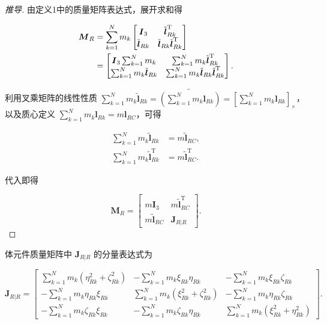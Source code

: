 \begin{proof}[推导]
由定义1中的质量矩阵表达式，展开求和得

\begin{align*}\boldsymbol{M}_R &= \sum_{k=1}^{N} m_k \begin{bmatrix} \boldsymbol{I}_3 & \tilde{\boldsymbol{l}}_{Rk}^{\mathrm{T}} \\ \tilde{\boldsymbol{l}}_{Rk} & \tilde{\boldsymbol{l}}_{Rk} \tilde{\boldsymbol{l}}_{Rk}^{\mathrm{T}} \end{bmatrix} \notag \\
&= \begin{bmatrix} \boldsymbol{I}_3 \sum_{k=1}^{N} m_k & \sum_{k=1}^{N} m_k \tilde{\boldsymbol{l}}_{Rk}^{\mathrm{T}} \\ \sum_{k=1}^{N} m_k \tilde{\boldsymbol{l}}_{Rk} & \sum_{k=1}^{N} m_k \tilde{\boldsymbol{l}}_{Rk} \tilde{\boldsymbol{l}}_{Rk}^{\mathrm{T}} \end{bmatrix}.\end{align*}

利用叉乘矩阵的线性性质 $\sum_{k=1}^{N} m_k \tilde{\boldsymbol{l}}_{Rk} = \widetilde{\left(\sum_{k=1}^{N} m_k \boldsymbol{l}_{Rk}\right)} = \left[\sum_{k=1}^{N} m_k \boldsymbol{l}_{Rk}\right]_{\times}$，以及质心定义 $\sum_{k=1}^{N} m_k \boldsymbol{l}_{Rk} = m \boldsymbol{l}_{RC}$，可得

\begin{align*}\sum_{k=1}^{N} m_k \tilde{\boldsymbol{l}}_{Rk} &= m \tilde{\boldsymbol{l}}_{RC}, \\
\sum_{k=1}^{N} m_k \tilde{\boldsymbol{l}}_{Rk}^{\mathrm{T}} &= m \tilde{\boldsymbol{l}}_{RC}^{\mathrm{T}}.\end{align*}

代入即得

\[
\boldsymbol{M}_R = \begin{bmatrix} m \boldsymbol{I}_3 & m \tilde{\boldsymbol{l}}_{RC}^{\mathrm{T}} \\ m \tilde{\boldsymbol{l}}_{RC} & \boldsymbol{J}_{R|R} \end{bmatrix}.
\]
\end{proof}
\begin{definition}[定义 8.3（惯性张量矩阵的分量表达式）]
体元件质量矩阵中 $\boldsymbol{J}_{R|R}$ 的分量表达式为

\[
\boldsymbol{J}_{R|R} = \begin{bmatrix} \sum_{k=1}^{N} m_k (\eta_{Rk}^2 + \zeta_{Rk}^2) & -\sum_{k=1}^{N} m_k \xi_{Rk} \eta_{Rk} & -\sum_{k=1}^{N} m_k \xi_{Rk} \zeta_{Rk} \\ -\sum_{k=1}^{N} m_k \eta_{Rk} \xi_{Rk} & \sum_{k=1}^{N} m_k (\xi_{Rk}^2 + \zeta_{Rk}^2) & -\sum_{k=1}^{N} m_k \eta_{Rk} \zeta_{Rk} \\ -\sum_{k=1}^{N} m_k \zeta_{Rk} \xi_{Rk} & -\sum_{k=1}^{N} m_k \zeta_{Rk} \eta_{Rk} & \sum_{k=1}^{N} m_k (\xi_{Rk}^2 + \eta_{Rk}^2) \end{bmatrix}.
\]
\end{definition}
